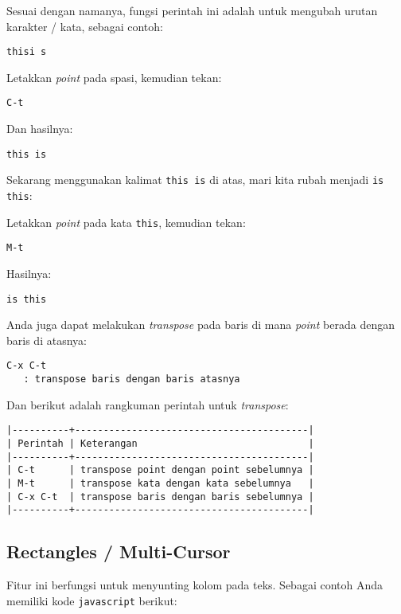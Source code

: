 \documentclass{article}
\begin{document}
Sesuai dengan namanya, fungsi perintah ini adalah untuk mengubah urutan
karakter / kata, sebagai contoh:

\begin{verbatim}
thisi s
\end{verbatim}

Letakkan \emph{point} pada spasi, kemudian tekan:

\begin{verbatim}
C-t
\end{verbatim}

Dan hasilnya:

\begin{verbatim}
this is
\end{verbatim}

Sekarang menggunakan kalimat \verb=this is= di atas, mari kita rubah
menjadi \verb=is this=:

Letakkan \emph{point} pada kata \verb=this=, kemudian tekan:

\begin{verbatim}
M-t
\end{verbatim}

Hasilnya:

\begin{verbatim}
is this
\end{verbatim}

Anda juga dapat melakukan \emph{transpose} pada baris di mana \emph{point}
berada dengan baris di atasnya:

\begin{verbatim}
C-x C-t
   : transpose baris dengan baris atasnya
\end{verbatim}

Dan berikut adalah rangkuman perintah untuk \emph{transpose}:

\begin{verbatim}
|----------+-----------------------------------------|
| Perintah | Keterangan                              |
|----------+-----------------------------------------|
| C-t      | transpose point dengan point sebelumnya |
| M-t      | transpose kata dengan kata sebelumnya   |
| C-x C-t  | transpose baris dengan baris sebelumnya |
|----------+-----------------------------------------|
\end{verbatim}

\subsection{Rectangles / Multi-Cursor}
Fitur ini berfungsi untuk menyunting kolom pada teks. Sebagai contoh Anda 
memiliki kode \verb=javascript= berikut:
\end{document}
